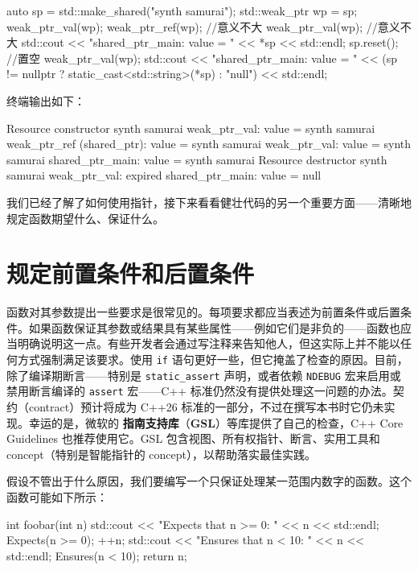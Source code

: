 \begin{codebox}[cpp]
auto sp = std::make_shared("synth samurai");
std::weak_ptr wp = sp;
weak_ptr_val(wp);
weak_ptr_ref(wp); //意义不大
weak_ptr_val(wp); //意义不大
std::cout << "shared_ptr_main: value = " << *sp << std::endl;
sp.reset();  //置空
weak_ptr_val(wp);
std::cout << "shared_ptr_main: value = "
          << (sp != nullptr ? static_cast<std::string>(*sp) : "null")
          << std::endl;
\end{codebox}

终端输出如下：

\begin{codebox}[text]
Resource constructor synth samurai
weak_ptr_val: value = synth samurai
weak_ptr_ref (shared_ptr): value = synth samurai
weak_ptr_val: value = synth samurai
shared_ptr_main: value = synth samurai
Resource destructor synth samurai
weak_ptr_val: expired
shared_ptr_main: value = null
\end{codebox}

我们已经了解了如何使用指针，接下来看看健壮代码的另一个重要方面——清晰地规定函数期望什么、保证什么。

\section{规定前置条件和后置条件}

\label{idx:461}
\label{idx:462}
函数对其参数提出一些要求是很常见的。每项要求都应当表述为前置条件或后置条件。如果函数保证其参数或结果具有某些属性——例如它们是非负的——函数也应当明确说明这一点。有些开发者会通过写注释来告知他人，但这实际上并不能以任何方式强制满足该要求。使用 \texttt{if} 语句更好一些，但它掩盖了检查的原因。目前，除了编译期断言——特别是 \texttt{static\_\allowbreak{}assert} 声明，或者依赖 \texttt{NDEBUG} 宏来启用或禁用断言编译的 \texttt{assert} 宏——C++ 标准仍然没有提供处理这一问题的办法。契约（contract）预计将成为 C++26 标准的一部分，不过在撰写本书时它仍未实现。幸运的是，微软的 \textbf{指南支持库}（\textbf{GSL}）等库提供了自己的检查，C++ Core Guidelines 也推荐使用它。GSL 包含视图、所有权指针、断言、实用工具和 concept（特别是智能指针的 concept），以帮助落实最佳实践。

假设不管出于什么原因，我们要编写一个只保证处理某一范围内数字的函数。这个函数可能如下所示：

\begin{codebox}[cpp]
int foobar(int n) {
    std::cout << "Expects that n >= 0: " << n << std::endl;
    Expects(n >= 0);
    ++n;
    std::cout << "Ensures that n < 10: " << n << std::endl;
    Ensures(n < 10);
    return n;
}
\end{codebox}

